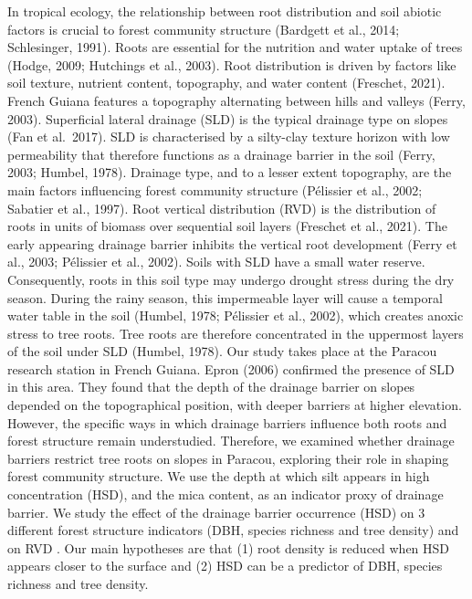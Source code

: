 \documentclass[fleqn,12pt]{latex/stylish_article} %
\begin{document}
In tropical ecology, the relationship between root distribution and soil abiotic factors is crucial to forest community structure (Bardgett et al., 2014; Schlesinger, 1991). Roots are essential for the nutrition and water uptake of trees (Hodge, 2009; Hutchings et al., 2003). Root distribution is driven by factors like soil texture, nutrient content, topography, and water content (Freschet, 2021).
French Guiana features a topography alternating between hills and valleys (Ferry, 2003). Superficial lateral drainage (SLD) is the typical drainage type on slopes (Fan et al.~2017). SLD is characterised by a silty-clay texture horizon with low permeability that therefore functions as a drainage barrier in the soil (Ferry, 2003; Humbel, 1978). Drainage type, and to a lesser extent topography, are the main factors influencing forest community structure (Pélissier et al., 2002; Sabatier et al., 1997).
Root vertical distribution (RVD) is the distribution of roots in units of biomass over sequential soil layers (Freschet et al., 2021). The early appearing drainage barrier inhibits the vertical root development (Ferry et al., 2003; Pélissier et al., 2002). Soils with SLD have a small water reserve. Consequently, roots in this soil type may undergo drought stress during the dry season. During the rainy season, this impermeable layer will cause a temporal water table in the soil (Humbel, 1978; Pélissier et al., 2002), which creates anoxic stress to tree roots. Tree roots are therefore concentrated in the uppermost layers of the soil under SLD (Humbel, 1978).
Our study takes place at the Paracou research station in French Guiana. Epron (2006) confirmed the presence of SLD in this area. They found that the depth of the drainage barrier on slopes depended on the topographical position, with deeper barriers at higher elevation. However, the specific ways in which drainage barriers influence both roots and forest structure remain understudied. Therefore, we examined whether drainage barriers restrict tree roots on slopes in Paracou, exploring their role in shaping forest community structure. We use the depth at which silt appears in high concentration (HSD), and the mica content, as an indicator proxy of drainage barrier. We study the effect of the drainage barrier occurrence (HSD) on 3 different forest structure indicators (DBH, species richness and tree density) and on RVD . Our main hypotheses are that (1) root density is reduced when HSD appears closer to the surface and (2) HSD can be a predictor of DBH, species richness and tree density.
\end{document}
